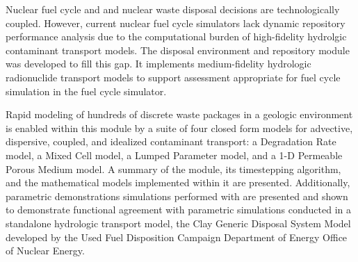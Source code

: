 Nuclear fuel cycle and and nuclear waste disposal decisions are
technologically coupled.  However, current nuclear fuel cycle simulators lack dynamic
repository performance analysis due to the computational burden of
high-fidelity hydrolgic contaminant transport models. The \Cyder disposal 
environment and repository module was developed to fill this gap. It implements medium-fidelity hydrologic 
radionuclide transport models to support assessment appropriate for fuel
cycle simulation in the \Cyclus fuel cycle simulator. 

Rapid modeling of hundreds of discrete waste packages in a geologic environment 
is enabled within this module by a suite of four closed form models for 
advective, dispersive, coupled, and idealized contaminant transport: a 
Degradation Rate model, a Mixed Cell model, a Lumped Parameter model, and a 1-D 
Permeable Porous Medium model.  A summary of the \Cyder module, its 
timestepping algorithm, and the mathematical models implemented within it are 
presented. Additionally, parametric demonstrations simulations performed with 
\Cyder are presented and shown to demonstrate functional agreement with parametric 
simulations conducted in a standalone hydrologic transport model, the Clay 
Generic Disposal System Model developed by the Used Fuel Disposition Campaign 
Department of Energy Office of Nuclear Energy. 


